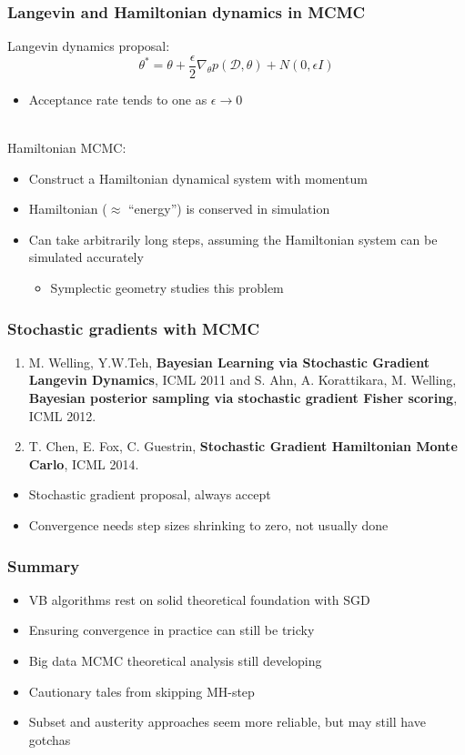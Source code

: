 \documentclass{beamer}
\newcommand{\dataset}{\mathcal{D}}
\newcommand{\parameters}{\theta}
\begin{document}
\begin{frame}
  \frametitle{Langevin and Hamiltonian dynamics in MCMC}

  Langevin dynamics proposal:
  $$ \parameters^* = \parameters + \frac{\epsilon}{2} \nabla_\parameters p(\dataset, \parameters) + N(0, \epsilon I) $$
  \begin{itemize}
  \item Acceptance rate tends to one as $\epsilon \rightarrow 0$
  \end{itemize}
  \mbox{}\\
  Hamiltonian MCMC:
  \begin{itemize}
  \item Construct a Hamiltonian dynamical system with momentum
  \item Hamiltonian ($\approx$ ``energy'') is conserved in simulation
  \item Can take arbitrarily long steps, assuming the Hamiltonian
    system can be simulated accurately
    \begin{itemize}
    \item Symplectic geometry studies this problem
    \end{itemize}
  \end{itemize}
\end{frame}

\begin{frame}[allowframebreaks]
  \frametitle{Stochastic gradients with MCMC}

  \begin{enumerate}
  \item M. Welling, Y.W.Teh, \textbf{Bayesian Learning via Stochastic Gradient Langevin Dynamics}, ICML 2011 and S. Ahn, A. Korattikara, M. Welling, \textbf{Bayesian posterior sampling via stochastic gradient Fisher scoring}, ICML 2012.
  \item T. Chen, E. Fox, C. Guestrin, \textbf{Stochastic Gradient Hamiltonian Monte Carlo}, ICML 2014.
  \end{enumerate}

  \begin{itemize}
  \item Stochastic gradient proposal, always accept
  \item Convergence needs step sizes shrinking to zero, not usually done
  \end{itemize}
\end{frame}


\begin{frame}
  \frametitle{Summary}

  \begin{itemize}
  \item VB algorithms rest on solid theoretical foundation with SGD
  \item Ensuring convergence in practice can still be tricky
  \item Big data MCMC theoretical analysis still developing
  \item Cautionary tales from skipping MH-step
  \item Subset and austerity approaches seem more reliable, but may
    still have gotchas
  \end{itemize}
\end{frame}
\end{document}
